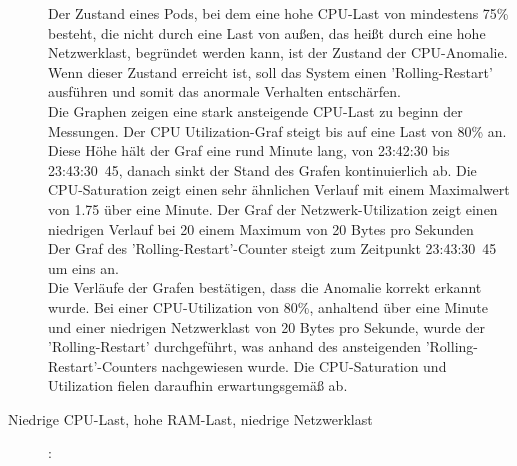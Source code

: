 \documentclass[a4paper,10pt]{scrartcl}
\begin{document}
\begin{description}
Der Zustand eines Pods, bei dem eine hohe CPU-Last von mindestens 75\% besteht, die nicht durch eine Last von außen, das heißt durch eine hohe Netzwerklast, begründet werden kann, ist der Zustand der CPU-Anomalie. Wenn dieser Zustand erreicht ist, soll das System einen 'Rolling-Restart' ausführen und somit das anormale Verhalten entschärfen.\\
Die Graphen zeigen eine stark ansteigende CPU-Last zu beginn der Messungen. Der CPU Utilization-Graf steigt bis auf eine Last von 80\% an. Diese Höhe hält der Graf eine rund Minute lang, von 23:42:30 bis 23:43:30~45, danach sinkt der Stand des Grafen kontinuierlich ab. Die CPU-Saturation zeigt einen sehr ähnlichen Verlauf mit einem Maximalwert von 1.75 über eine Minute. Der Graf der Netzwerk-Utilization zeigt einen niedrigen Verlauf bei 20 einem Maximum von 20 Bytes pro Sekunden\\
Der Graf des 'Rolling-Restart'-Counter steigt zum Zeitpunkt 23:43:30~45 um eins an.\\
Die Verläufe der Grafen bestätigen, dass die Anomalie korrekt erkannt wurde. Bei einer CPU-Utilization von 80\%, anhaltend über eine Minute und einer niedrigen Netzwerklast von 20 Bytes pro Sekunde, wurde der 'Rolling-Restart' durchgeführt, was anhand des ansteigenden 'Rolling-Restart'-Counters nachgewiesen wurde. Die CPU-Saturation und Utilization fielen daraufhin erwartungsgemäß ab.

\pagebreak

\item[Niedrige CPU-Last, hohe RAM-Last, niedrige Netzwerklast]:\\


\end{description}
\end{document}
